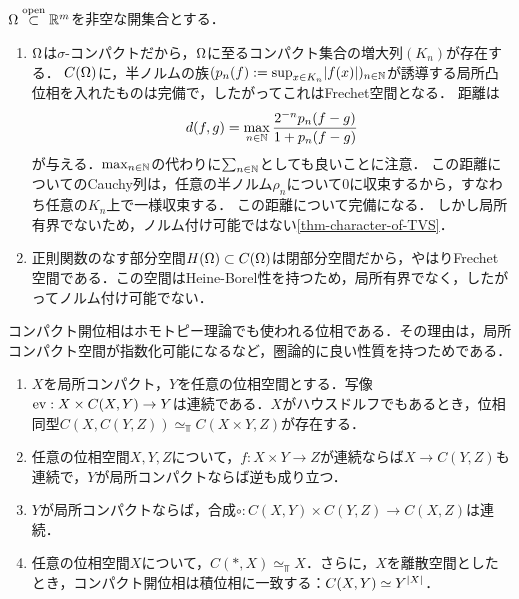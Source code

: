 \documentclass[uplatex,dvipdfmx]{jsreport}
\begin{document}
\begin{example}[コンパクト開位相は距離化可能だがノルム付け可能でない]
    $\Omega\overset{\mathrm{open}}{\subset}\mathbb{R}^m$を非空な開集合とする．
    \begin{enumerate}
        \item $\Omega$は$\sigma$-コンパクトだから，$\Omega$に至るコンパクト集合の増大列$(K_n)$が存在する．
        $C(\Omega)$に，半ノルムの族$(p_n(f):=\sup_{x\in K_n}\lvert f(x)\rvert)_{n\in\mathbb{N}}$が誘導する局所凸位相を入れたものは完備で，したがってこれはFrechet空間となる．
        距離は
        \[d(f,g)=\max_{n\in\mathbb{N}}\frac{2^{-n}p_n(f-g)}{1+p_n(f-g)}\]
        が与える．$\max_{n\in\mathbb{N}}$の代わりに$\sum_{n\in\mathbb{N}}$としても良いことに注意．
        この距離についてのCauchy列は，任意の半ノルム$\rho_n$について$0$に収束するから，すなわち任意の$K_n$上で一様収束する．
        この距離について完備になる．
        しかし局所有界でないため，ノルム付け可能ではない\ref{thm-character-of-TVS}．
        \item 正則関数のなす部分空間$H(\Omega)\subset C(\Omega)$は閉部分空間だから，やはりFrechet空間である．この空間はHeine-Borel性を持つため，局所有界でなく，したがってノルム付け可能でない．
    \end{enumerate}
    コンパクト開位相はホモトピー理論でも使われる位相である．その理由は，局所コンパクト空間が指数化可能になるなど，圏論的に良い性質を持つためである．
    \begin{enumerate}
        \item $X$を局所コンパクト，$Y$を任意の位相空間とする．写像$\mathrm{ev}:X\times C(X,Y)\to Y$は連続である．$X$がハウスドルフでもあるとき，位相同型$C(X,C(Y,Z))\simeq_\Top C(X\times Y,Z)$が存在する．
        \item 任意の位相空間$X,Y,Z$について，$f:X\times Y\to Z$が連続ならば$X\to C(Y,Z)$も連続で，$Y$が局所コンパクトならば逆も成り立つ．
        \item $Y$が局所コンパクトならば，合成$\circ:C(X,Y)\times C(Y,Z)\to C(X,Z)$は連続．
        \item 任意の位相空間$X$について，$C(*,X)\simeq_\Top X$．さらに，$X$を離散空間としたとき，コンパクト開位相は積位相に一致する：$C(X,Y)\simeq Y^{\lvert X\rvert}$．
    \end{enumerate}
\end{example}
\end{document}

